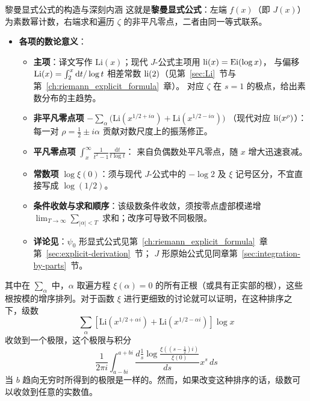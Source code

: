\begin{commentary}{黎曼显式公式的构造与深刻内涵}
这就是\textbf{黎曼显式公式}：左端 $f(x)$（即 $J(x)$）为素数幂计数，右端求和遍历 $\zeta$ 的非平凡零点，二者由同一等式联系。
\begin{itemize}
    \item \textbf{各项的数论意义}：
    \begin{itemize}
        \item \textbf{主项}：译文写作 $\mathrm{Li}(x)$；现代 $J$-公式主项用 $\operatorname{li}(x)=\operatorname{Ei}(\log x)$，
        与偏移 $\operatorname{Li}(x)=\int_2^x\mathrm{d}t/\log t$ 相差常数 $\operatorname{li}(2)$（见第~\ref{sec:Li}~节与第~\ref{ch:riemann_explicit_formula}~章）。
        对应 $\zeta$ 在 $s=1$ 的极点，给出素数分布的主趋势。
        \item \textbf{非平凡零点项}
        $ -\sum_{\alpha}\bigl(\mathrm{Li}(x^{1/2+i\alpha})+\mathrm{Li}(x^{1/2-i\alpha})\bigr)$
        （现代对应 $\operatorname{li}(x^\rho)$）：每一对 $\rho=\frac12\pm i\alpha$ 贡献对数尺度上的振荡修正。
        \item \textbf{平凡零点项}
        $\int_x^\infty\frac{1}{t^2-1}\frac{\mathrm{d}t}{t\log t}$：
        来自负偶数处平凡零点，随 $x$ 增大迅速衰减。
        \item \textbf{常数项} $\log\xi(0)$：须与现代 $J$-公式中的 $-\log 2$ 及 $\xi$ 记号区分，不宜直接写成 $\log(1/2)$。
        \item \textbf{条件收敛与求和顺序}：该级数条件收敛，须按零点虚部模递增
        $\lim_{T\to\infty}\sum_{|\alpha|<T}$ 求和；改序可导致不同极限。
        \item \textbf{详论见}：$\psi_0$ 形显式公式见第~\ref{ch:riemann_explicit_formula}~章第~\ref{sec:explicit-derivation}~节；
        $J$ 形原始公式见同章第~\ref{sec:integration-by-parts}~节。
    \end{itemize}
\end{itemize}
\end{commentary}

其中在 $\sum_{\alpha}$ 中，$\alpha$ 取遍方程 $\xi(\alpha) = 0$ 的所有正根（或具有正实部的根），这些根按模的增序排列。对于函数 $\xi$ 进行更细致的讨论就可以证明，在这种排序之下，级数
\[
\sum_{\alpha} \left[\text{Li}\left(x^{1/2+\alpha i}\right) + \text{Li}\left(x^{1/2-\alpha i}\right)\right] \log x
\]
收敛到一个极限，这个极限与积分
\[
\frac{1}{2\pi i} \int_{a-bi}^{a+bi} \frac{d \frac{1}{s}\log\frac{\xi\left(\left(s-\frac{1}{2}\right)i\right)}{\xi(0)}}{ds} x^s \, ds
\]
当 $b$ 趋向无穷时所得到的极限是一样的。然而，如果改变这种排序的话，级数可以收敛到任意的实数值。

